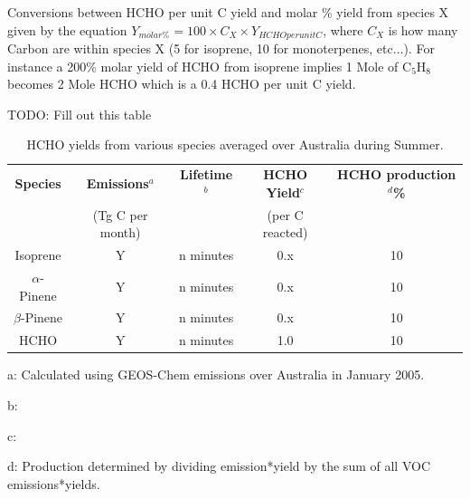     Conversions between HCHO per unit C yield and molar \% yield from species X given by the equation $ Y_{molar \%} = 100 \times C_X \times Y_{HCHO per unit C} $, where $C_X$ is how many Carbon are within species X (5 for isoprene, 10 for monoterpenes, etc...).
    For instance a 200\% molar yield of HCHO from isoprene implies 1 Mole of C$_5$H$_8$ becomes 2 Mole HCHO which is a 0.4 HCHO per unit C yield.
    
    TODO: Fill out this table
    \begin{table} \begin{threeparttable}
      \caption{HCHO yields from various species averaged over Australia during Summer.}
      \begin{tabular}{ | c  c  c  c  c | }
        \toprule
        \textbf{Species}   & \textbf{Emissions$^a$}& \textbf{Lifetime$^b$}& \textbf{HCHO Yield$^c$} & \textbf{HCHO production$^d$\%}
        \\                 & (Tg C per month)      &                      & (per C reacted)         &         \\
        \midrule
        Isoprene           & Y                     & n minutes            & 0.x                     & 10       \\
        $\alpha$-Pinene    & Y                     & n minutes            & 0.x                     & 10       \\
        $\beta$-Pinene     & Y                     & n minutes            & 0.x                     & 10       \\
        HCHO               & Y                     & n minutes            & 1.0                     & 10       \\
        \bottomrule
      \end{tabular}
      \begin{tablenotes} 
        \item a: Calculated using GEOS-Chem emissions over Australia in January 2005.
        \item b:  
        \item c: 
        \item d: Production determined by dividing emission*yield by the sum of all VOC emissions*yields. 
      \end{tablenotes}
      \label{BioIsop:Method:tab_VOCAusYields}
    \end{threeparttable} \end{table}
    
    
